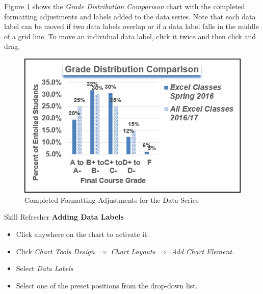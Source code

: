 Figure \ref{04:fig39} shows the \textit{Grade Distribution Comparison} chart with the completed formatting adjustments and labels added to the data series. Note that each data label can be moved if two data labels overlap or if a data label falls in the middle of a grid line. To move an individual data label, click it twice and then click and drag.

\begin{figure}[H]
	\centering
	\includegraphics[width=\maxwidth{.95\linewidth}]{gfx/ch04_fig39}
	\caption{Completed Formatting Adjustments for the Data Series}
	\label{04:fig39}
\end{figure}

\begin{center}
	\begin{sklbox}{Skill Refresher}
		\textbf{Adding Data Labels}
		\\
		\begin{itemize}
			\setlength{\itemsep}{0pt}
			\setlength{\parskip}{0pt}
			\setlength{\parsep}{0pt}

			\item Click anywhere on the chart to activate it.
			\item Click \textit{Chart Tools Design $ \Rightarrow $ Chart Layouts $ \Rightarrow $ Add Chart Element}.
			\item Select \textit{Data Labels}
			\item Select one of the preset positions from the drop-down list.
			
		\end{itemize}
	\end{sklbox}
\end{center}


